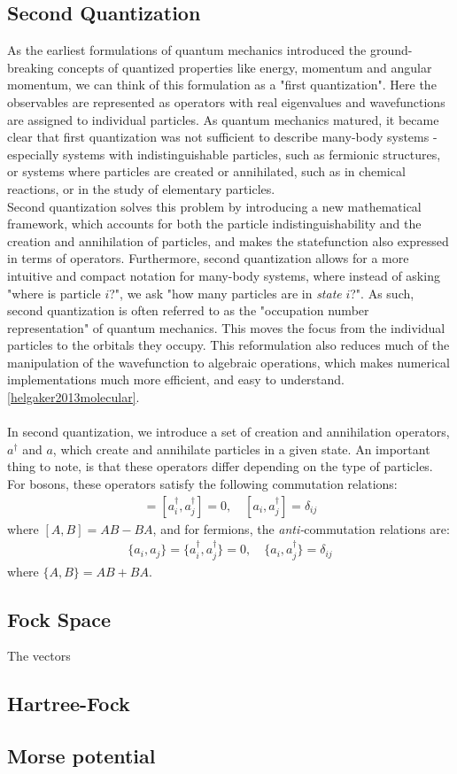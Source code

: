 \documentclass{subfiles}
\begin{document}
\subsection*{Second Quantization}
As the earliest formulations of quantum mechanics introduced the ground-breaking concepts of quantized properties like energy, momentum and angular momentum, we can think of this formulation as a "first quantization". Here the observables are represented as operators with real eigenvalues and wavefunctions are assigned to individual particles.
As quantum mechanics matured, it became clear that first quantization was not sufficient to describe many-body systems - especially systems with indistinguishable particles, such as fermionic structures, or systems where particles are created or annihilated, such as in chemical reactions, or in the study of elementary particles.\\  
Second quantization solves this problem by introducing a new mathematical framework, which accounts for both the particle indistinguishability and the creation and annihilation of particles, and makes the statefunction also expressed in terms of operators. Furthermore, second quantization allows for a more intuitive and compact notation for many-body systems, where instead of asking "where is particle $i$?", we ask "how many particles are in \emph{state} $i$?". 
As such, second quantization is often referred to as the "occupation number representation" of quantum mechanics. This moves the focus from the individual particles to the orbitals they occupy. This reformulation also reduces much of the manipulation of the wavefunction to algebraic operations, which makes numerical implementations much more efficient, and easy to understand.\ref{helgaker2013molecular}.
\\ \\ In second quantization, we introduce a set of creation and annihilation operators, $a^\dagger$ and $a$, which create and annihilate particles in a given state. An important thing to note, is that these operators differ depending on the type of particles. For bosons, these operators satisfy the following commutation relations:
\begin{align*}
    [a_i, a_j] = [a^\dagger_i, a^\dagger_j] = 0, \quad [a_i, a^\dagger_j] = \delta_{ij}
\end{align*}
where $[A, B] = AB - BA$, and for fermions, the \emph{anti-}commutation relations are:
\begin{align*}
    \{a_i, a_j\} = \{a^\dagger_i, a^\dagger_j\} = 0, \quad \{a_i, a^\dagger_j\} = \delta_{ij}
\end{align*}
where $\{A, B\} = AB + BA$.
\subsection{Fock Space}
The vectors 
\subsection*{Hartree-Fock}
\subsection*{Morse potential}
\end{document}
